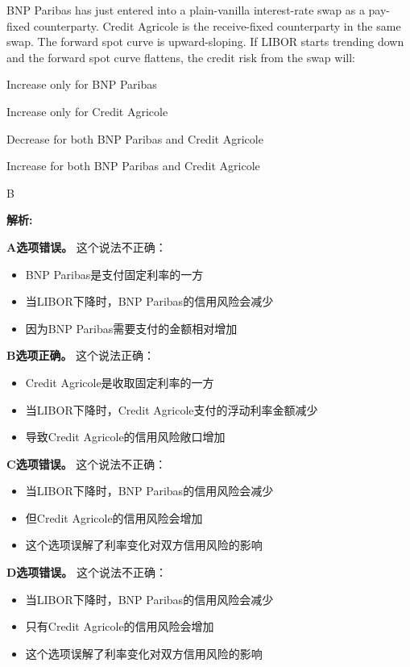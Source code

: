 \documentclass{article}
\newcounter{question} %
\newenvironment{explanation}
{\textbf{解析:}\par}
{\par}
\begin{document}
\begin{question}
    BNP Paribas has just entered into a plain-vanilla interest-rate swap as a pay-fixed counterparty. Credit Agricole is the receive-fixed counterparty in the same swap. The forward spot curve is upward-sloping. If LIBOR starts trending down and the forward spot curve flattens, the credit risk from the swap will:
\end{question}

\begin{choices}
    \item Increase only for BNP Paribas
    \item Increase only for Credit Agricole
    \item Decrease for both BNP Paribas and Credit Agricole
    \item Increase for both BNP Paribas and Credit Agricole
\end{choices}

\begin{correctanswer}
    B
\end{correctanswer}

\begin{explanation}
    \textbf{A选项错误。}
    这个说法不正确：
    \begin{itemize}
        \item BNP Paribas是支付固定利率的一方
        \item 当LIBOR下降时，BNP Paribas的信用风险会减少
        \item 因为BNP Paribas需要支付的金额相对增加
    \end{itemize}

    \textbf{B选项正确。}
    这个说法正确：
    \begin{itemize}
        \item Credit Agricole是收取固定利率的一方
        \item 当LIBOR下降时，Credit Agricole支付的浮动利率金额减少
        \item 导致Credit Agricole的信用风险敞口增加
    \end{itemize}

    \textbf{C选项错误。}
    这个说法不正确：
    \begin{itemize}
        \item 当LIBOR下降时，BNP Paribas的信用风险会减少
        \item 但Credit Agricole的信用风险会增加
        \item 这个选项误解了利率变化对双方信用风险的影响
    \end{itemize}

    \textbf{D选项错误。}
    这个说法不正确：
    \begin{itemize}
        \item 当LIBOR下降时，BNP Paribas的信用风险会减少
        \item 只有Credit Agricole的信用风险会增加
        \item 这个选项误解了利率变化对双方信用风险的影响
    \end{itemize}
\end{explanation}
\end{document}
